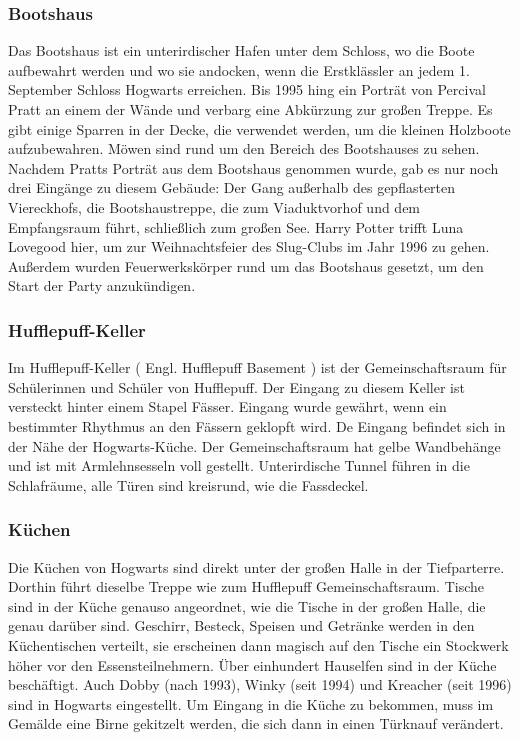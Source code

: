\documentclass[a4paper, 10pt]{article}
\begin{document}
\subsubsection*{\large Bootshaus}
Das Bootshaus ist ein unterirdischer Hafen unter dem Schloss, wo die Boote aufbewahrt werden und wo sie andocken, wenn die Erstklässler an jedem 1. September Schloss Hogwarts erreichen. Bis 1995 hing ein Porträt von Percival Pratt an einem der Wände und verbarg eine Abkürzung zur großen Treppe. Es gibt einige Sparren in der Decke, die verwendet werden, um die kleinen Holzboote aufzubewahren. Möwen sind rund um den Bereich des Bootshauses zu sehen.
\vspace{10pt}
\newline
Nachdem Pratts Porträt aus dem Bootshaus genommen wurde, gab es nur noch drei Eingänge zu diesem Gebäude: Der Gang außerhalb des gepflasterten Viereckhofs, die Bootshaustreppe, die zum Viaduktvorhof und dem Empfangsraum führt, schließlich zum großen See. Harry Potter trifft Luna Lovegood hier, um zur Weihnachtsfeier des Slug-Clubs im Jahr 1996 zu gehen. Außerdem wurden Feuerwerkskörper rund um das Bootshaus gesetzt, um den Start der Party anzukündigen.
\subsubsection*{\large Hufflepuff-Keller}
Im Hufflepuff-Keller (  Engl.  Hufflepuff Basement ) ist der Gemeinschaftsraum für Schülerinnen und Schüler von Hufflepuff. Der Eingang zu diesem Keller ist versteckt hinter einem Stapel Fässer. Eingang wurde gewährt, wenn ein bestimmter Rhythmus an den Fässern geklopft wird. De Eingang befindet sich in der Nähe der Hogwarts-Küche. Der Gemeinschaftsraum hat gelbe Wandbehänge und ist mit Armlehnsesseln voll gestellt. Unterirdische Tunnel führen in die Schlafräume, alle Türen sind kreisrund, wie die Fassdeckel.
\subsubsection*{\large Küchen}
Die Küchen von Hogwarts sind direkt unter der großen Halle in der Tiefparterre. Dorthin führt dieselbe Treppe wie zum Hufflepuff Gemeinschaftsraum. Tische sind in der Küche genauso angeordnet, wie die Tische in der großen Halle, die genau darüber sind. Geschirr, Besteck, Speisen und Getränke werden in den Küchentischen verteilt, sie erscheinen dann magisch auf den Tische ein Stockwerk höher vor den Essensteilnehmern. Über einhundert Hauselfen sind in der Küche beschäftigt. Auch Dobby (nach 1993), Winky (seit 1994) und Kreacher (seit 1996) sind in Hogwarts eingestellt.
\vspace{10pt}
\newline
Um Eingang in die Küche zu bekommen, muss im Gemälde eine Birne gekitzelt werden, die sich dann in einen Türknauf verändert.
\end{document}
